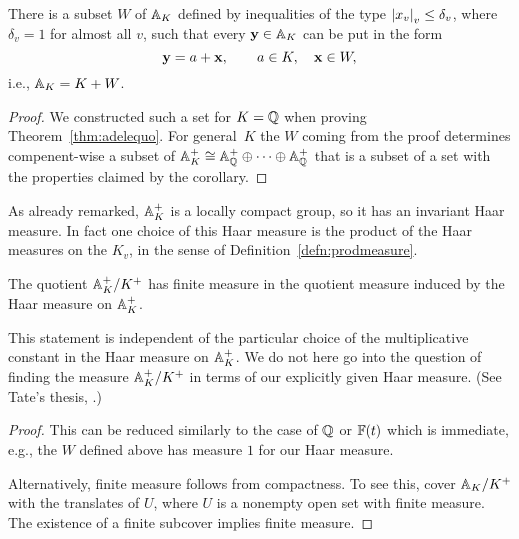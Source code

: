 \begin{corollary}\label{cor:subsetW}
There is a subset $W$ of $\AA_K$ defined by inequalities of the
type $\abs{x_v}_v \leq \delta_v$, where $\delta_v=1$
for almost all $v$, such that every $\by\in\AA_K$ can
be put in the form
$$
  \by = a + \bx, \qquad a\in K, \quad \bx \in W,
$$
i.e., $\AA_K = K + W$.
\end{corollary}
\begin{proof}
  We constructed such a set for $K=\Q$ when proving
  Theorem~\ref{thm:adelequo}.  For general~$K$ the $W$ coming from the
  proof determines compenent-wise a subset of $\AA_K^+\isom
  \AA_\Q^+\oplus \cdots \oplus \AA_\Q^+$ that is a subset of a set
  with the properties claimed by the corollary.
\end{proof}

As already remarked, $\AA_K^+$ is a locally compact group, so it has
an invariant Haar measure.  In fact one choice of this Haar measure is
the product of the Haar measures on the $K_v$, in the sense
of Definition~\ref{defn:prodmeasure}.

\begin{corollary}\label{cor:finitemeasure}
The quotient $\AA_K^+/K^+$ has finite measure in the quotient measure
induced by the Haar measure on $\AA_K^+$.
\end{corollary}
\begin{remark}
This statement is independent of the particular choice
of the multiplicative constant in the Haar measure
on $\AA_K^+$.  We do not here go into the question of
finding the measure $\AA_K^+/K^+$ in terms of our
explicitly given Haar measure.  (See Tate's thesis,
\cite[Chapter XV]{cassels-frohlich}.)
\end{remark}
\begin{proof}
This can be reduced similarly to the case of $\Q$
or $\F(t)$ which is immediate, e.g., the $W$ defined
above has measure $1$ for our Haar measure.

Alternatively, finite measure follows from compactness.  To see
this,  cover
$\AA_K/K^+$ with the translates of $U$, where $U$ is a nonempty open
set with finite measure.  The existence of a finite subcover implies
finite measure.
\end{proof}

